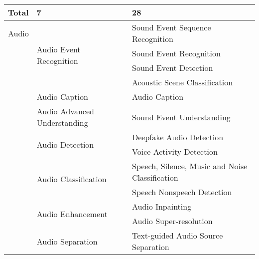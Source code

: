 \begin{longtable}{p{1.5cm}p{6cm}p{7cm}}
     \cline{2-3}
     Total & 7 & 28  \\  %
    \midrule
    Audio & \multirow{4}{*}{Audio Event Recognition} & Sound Event Sequence Recognition \\
                           \multirow{17}{*}{} &                                           & Sound Event Recognition  \\
                           &                                           & Sound Event Detection  \\
                           &                                           & Acoustic Scene Classification  \\
                           \cline{2-3} %
                           & Audio Caption & Audio Caption \\
                           \cline{2-3} %
                         & Audio Advanced Understanding & Sound Event Understanding  \\
                         \cline{2-3} %
                         &  \multirow{2}{*}{Audio Detection} & Deepfake Audio Detection \\
                         &                  & Voice Activity Detection  \\
                         \cline{2-3} %
                         & \multirow{2}{*}{Audio Classification} & Speech, Silence, Music and Noise Classification \\
                         &                                        & Speech Nonspeech Detection \\
                         \cline{2-3} %
                         & \multirow{2}{*}{Audio Enhancement} &  Audio Inpainting     \\
                         &                                   & Audio Super-resolution    \\
                         \cline{2-3} %
                         &  \multirow{3}{*}{Audio Separation} & Text-guided Audio Source Separation  \\

\end{longtable}
